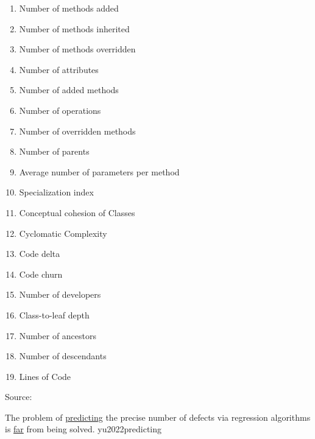 \documentclass{article}
\begin{document}
{\begin{pptWide}{5}
\begin{enumerate}
  \item \textbf{} Number of methods added
  \item \textbf{} Number of methods inherited
  \item \textbf{} Number of methods overridden
  \item \textbf{} Number of attributes
  \item \textbf{} Number of added methods
  \item \textbf{} Number of operations
  \item \textbf{} Number of overridden methods
  \item \textbf{} Number of parents
  \item \textbf{} Average number of parameters per method
  \item \textbf{} Specialization index
  \item \textbf{} Conceptual cohesion of Classes
  \item \textbf{} Cyclomatic Complexity
  \item \textbf{} Code delta
  \item \textbf{} Code churn
  \item \textbf{} Number of developers
  \item \textbf{} Class-to-leaf depth
  \item \textbf{} Number of ancestors
  \item \textbf{} Number of descendants
  \item \textbf{} Lines of Code
  \end{enumerate}
  \end{pptWide}
  \par
  {\scriptsize Source: \par}}

  {The problem of \ul{predicting} the precise number of defects via regression algorithms is \ul{far} from being solved.}
  {yu2022predicting}
\end{document}
